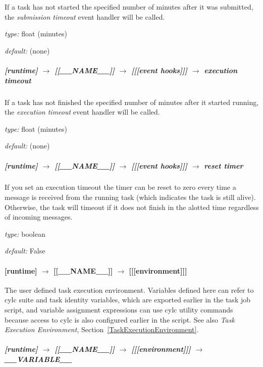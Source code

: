 If a task has not started the specified number of minutes after it was
submitted, the {\em submission timeout} event handler will be called.
\begin{myitemize}
    \item {\em type:} float (minutes)
    \item {\em default:} (none)
\end{myitemize}

\subparagraph[execution timeout]{[runtime] $\rightarrow$ [[\_\_NAME\_\_]] $\rightarrow$ [[[event hooks]]] $\rightarrow$ execution timeout}

If a task has not finished the specified number of minutes after it
started running, the {\em execution timeout} event handler will be
called.
\begin{myitemize}
    \item {\em type:} float (minutes)
    \item {\em default:} (none)
\end{myitemize}

\subparagraph[reset timer]{[runtime] $\rightarrow$ [[\_\_NAME\_\_]] $\rightarrow$ [[[event hooks]]] $\rightarrow$ reset timer}

If you set an execution timeout the timer can be reset to zero every
time a message is received from the running task (which indicates the 
task is still alive).  Otherwise, the task will timeout if it does not
finish in the alotted time regardless of incoming messages.

\begin{myitemize}
\item {\em type:} boolean
\item {\em default:} False
\end{myitemize}

\paragraph[{[[[}environment{]]]}]{[runtime] $\rightarrow$ [[\_\_NAME\_\_]] $\rightarrow$ [[[environment]]]}

The user defined task execution environment. Variables defined here can
refer to cylc suite and task identity variables, which are exported
earlier in the task job script, and variable assignment expressions can
use cylc utility commands because access to cylc is also configured
earlier in the script.  See also {\em Task Execution Environment},
Section~\ref{TaskExecutionEnvironment}.

\subparagraph[\_\_VARIABLE\_\_ ]{[runtime] $\rightarrow$ [[\_\_NAME\_\_]] $\rightarrow$ [[[environment]]] $\rightarrow$ \_\_VARIABLE\_\_}
\label{AppendixTaskExecutionEnvironment}

